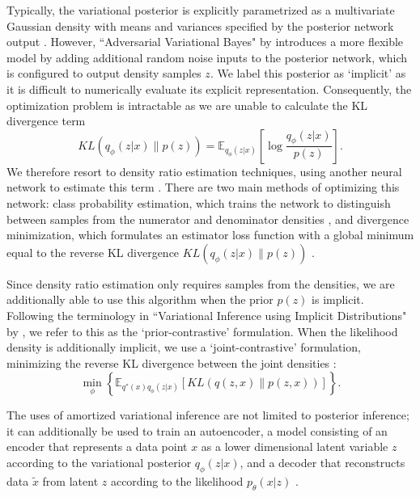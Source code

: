 \documentclass[honours,12pt, twoside]{unswthesis}
\newcommand{\E}{\mathbb{E}}
\numberwithin{equation}{section}
\theoremstyle{definition}
\begin{document}
Typically, the variational posterior is explicitly parametrized as a multivariate Gaussian density with means and variances specified by the posterior network output \citep{kingma}. However, ``Adversarial Variational Bayes" by \citet{mescheder} introduces a more flexible model by adding additional random noise inputs to the posterior network, which is configured to output density samples $z$. We label this posterior as `implicit' as it is difficult to numerically evaluate its explicit representation. Consequently, the optimization problem is intractable as we are unable to calculate the KL divergence term\[KL(q_\phi(z|x)\|p(z))=\E_{q_\phi(z|x)}\left[\log \frac{q_\phi(z|x)}{p(z)}\right].\] We therefore resort to density ratio estimation techniques, using another neural network to estimate this term \citep{sugiyama, mohamed}. There are two main methods of optimizing this network: class probability estimation, which trains the network to distinguish between samples from the numerator and denominator densities \citep{gan}, and divergence minimization, which formulates an estimator loss function with a global minimum equal to the reverse KL divergence $KL(q_\phi(z|x)\|p(z))$ \citep{nguyen}.

Since density ratio estimation only requires samples from the densities, we are additionally able to use this algorithm when the prior $p(z)$ is implicit. Following the terminology in ``Variational Inference using Implicit Distributions" by \citet{huszar}, we refer to this as the `prior-contrastive' formulation. When the likelihood density is additionally implicit, we use a `joint-contrastive' formulation, minimizing the reverse KL divergence between the joint densities \citep{tran}:
\[\min_\phi \left\lbrace\E_{q^*(x)q_\phi(z|x)}\left[KL(q(z,x)\|p(z,x))\right]\right\rbrace.\]

The uses of amortized variational inference are not limited to posterior inference; it can additionally be used to train an autoencoder, a model consisting of an encoder that represents a data point $x$ as a lower dimensional latent variable $z$ according to the variational posterior $q_\phi(z|x)$, and a decoder that reconstructs data $\tilde{x}$ from latent $z$ according to the likelihood $p_\theta(x|z)$ \citep{kingma}.
\end{document}
